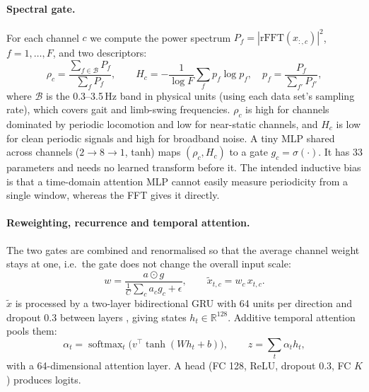 \documentclass[11pt,a4paper]{article}
\begin{document}
\paragraph{Spectral gate.}
For each channel $c$ we compute the power spectrum $P_f=|\mathrm{rFFT}(x_{:,c})|^2$, $f=1,\dots,F$, and two descriptors:
\begin{equation}
\rho_c = \frac{\sum_{f\in\mathcal{B}} P_f}{\sum_{f} P_f},\qquad
H_c = -\frac{1}{\log F}\sum_f p_f\log p_f,\quad p_f = \frac{P_f}{\sum_{f'}P_{f'}},
\end{equation}
where $\mathcal{B}$ is the 0.3--3.5\,Hz band in physical units (using each data set's sampling rate), which covers gait and limb-swing frequencies. $\rho_c$ is high for channels dominated by periodic locomotion and low for near-static channels, and $H_c$ is low for clean periodic signals and high for broadband noise. A tiny MLP shared across channels ($2\to8\to1$, tanh) maps $(\rho_c,H_c)$ to a gate $g_c=\sigma(\cdot)$. It has 33 parameters and needs no learned transform before it. The intended inductive bias is that a time-domain attention MLP cannot easily measure periodicity from a single window, whereas the FFT gives it directly.

\paragraph{Reweighting, recurrence and temporal attention.}
The two gates are combined and renormalised so that the average channel weight stays at one, i.e.\ the gate does not change the overall input scale:
\begin{equation}
w = \frac{a\odot g}{\tfrac{1}{C}\sum_c a_c g_c+\epsilon},\qquad \tilde{x}_{t,c}=w_c\,x_{t,c}.
\end{equation}
$\tilde{x}$ is processed by a two-layer bidirectional GRU \cite{cho2014learning,schuster1997bidirectional} with 64 units per direction and dropout 0.3 between layers \cite{srivastava2014dropout}, giving states $h_t\in\mathbb{R}^{128}$. Additive temporal attention \cite{bahdanau2015neural} pools them:
\begin{equation}
\alpha_t=\operatorname{softmax}_t\big(v^\top\tanh(W h_t+b)\big),\qquad z=\sum_t\alpha_t h_t ,
\end{equation}
with a 64-dimensional attention layer. A head (FC 128, ReLU, dropout 0.3, FC $K$) produces logits.
\end{document}
